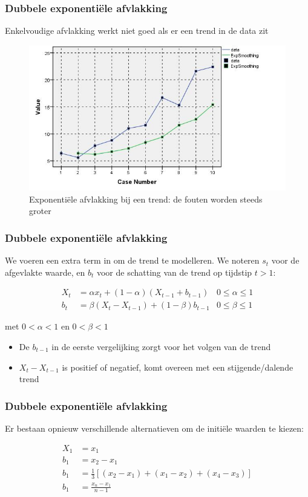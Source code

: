 \documentclass[aspectratio=169]{beamer}
\begin{document}
\begin{frame}
  \frametitle{Dubbele exponenti\"ele afvlakking}

  Enkelvoudige afvlakking werkt niet goed als er een trend in de data zit

  \begin{figure}
    \centering
    \includegraphics[width=.7\textwidth]{img/tijdreeks61}
    \caption{Exponenti\"ele afvlakking bij een trend: de fouten worden steeds groter}
    \label{fig:tijdreeks61}
  \end{figure}

\end{frame}


\begin{frame}
  \frametitle{Dubbele exponentiële afvlakking}

  We voeren een extra term in om de trend te modelleren. We noteren $s_t$ voor de afgevlakte waarde, en $b_t$ voor de schatting van de trend op tijdstip $t > 1$:

\begin{align*}
	X_{t} & = \alpha x_{t} + (1-\alpha)(X_{t-1} + b_{t-1}) & 0 \leq \alpha \leq 1                            \\
	b_{t} & = \beta(X_{t}-X_{t-1}) + (1-\beta)b_{t-1}      & 0 \leq \beta \leq 1 
\label{eq:doubleSmoothing}
\end{align*}

  met $0 < \alpha < 1$ en $0 < \beta < 1$
	
	
	\begin{itemize}
		\item De $b_{t-1}$ in de eerste vergelijking zorgt voor het volgen van de trend
		\item $X_{t}-X_{t-1}$ is positief of negatief, komt overeen met een stijgende/dalende trend
	\end{itemize}
\end{frame}

\begin{frame}
  \frametitle{Dubbele exponentiële afvlakking}
  Er bestaan opnieuw verschillende alternatieven om de initiële waarden te kiezen:

\begin{align*}
	X_{1} &= x_{1} \\
	b_{1} &= x_{2} - x_{1} \\
	b_{1} &= \frac{1}{3}\left[ (x_{2} - x_{1}) + (x_{1} - x_{2}) + (x_{4} - x_{3}) \right]\\
	b_{1} &= \frac{x_{n} - x_{1}}{n-1}
\end{align*}

\end{frame}
\end{document}

